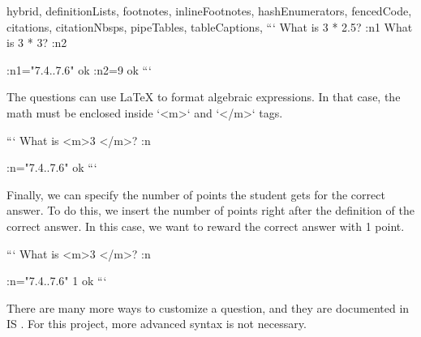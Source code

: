 \begin{markdown*}{%
  hybrid,
  definitionLists,
  footnotes,
  inlineFootnotes,
  hashEnumerators,
  fencedCode,
  citations,
  citationNbsps,
  pipeTables,
  tableCaptions,
}
```
What is 3 * 2.5? :n1
What is 3 * 3? :n2

:n1="7.4..7.6" ok
:n2=9 ok
```

The questions can use \LaTeX{} to format algebraic expressions. In that case, the math must be enclosed inside `<m>` and `</m>` tags. 

```
What is <m>3 </m>? :n

:n="7.4..7.6" ok
```

Finally, we can specify the number of points the student gets for the correct answer. To do this, we insert the number of points right after the definition of the correct answer. In this case, we want to reward the correct answer with 1 point.

```
What is <m>3 </m>? :n

:n="7.4..7.6" 1 ok
```

There are many more ways to customize a question, and they are documented in IS \cite{ropots_def}. For this project, more advanced syntax is not necessary.

\end{markdown*}
\shorthandon{-}
